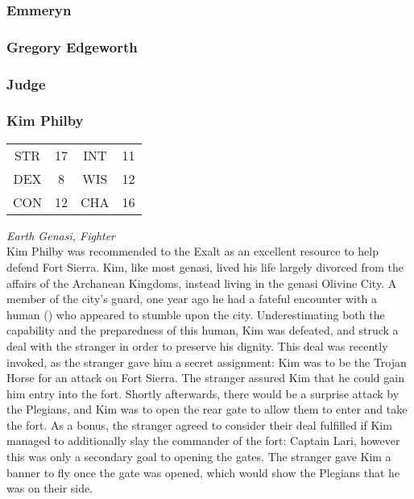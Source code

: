 \subsubsection{Emmeryn}
\label{people:emmeryn}

\subsubsection{Gregory Edgeworth}
\label{people:gregory}

\subsubsection{Judge}
\label{people:judge}

\subsubsection{Kim Philby}
\label{people:philby}
\begin{center}
\begin{tabular}{c c|c c}
STR & 17 & INT & 11\\
DEX & 8 & WIS & 12 \\
CON & 12 & CHA & 16 \end{tabular}\end{center}
\textit{Earth Genasi, Fighter}\\
Kim Philby was recommended to the Exalt as an excellent resource to help defend Fort Sierra. Kim, like most genasi, lived his life largely divorced from the affairs of the Archanean Kingdoms, instead living in the genasi Olivine City. A member of the city's guard, one year ago he had a fateful encounter with a human () who appeared to stumble upon the city. Underestimating both the capability and the preparedness of this human, Kim was defeated, and struck a deal with the stranger in order to preserve his dignity. This deal was recently invoked, as the stranger gave him a secret assignment: Kim was to be the Trojan Horse for an attack on Fort Sierra. The stranger assured Kim that he could gain him entry into the fort. Shortly afterwards, there would be a surprise attack by the Plegians, and Kim was to open the rear gate to allow them to enter and take the fort. As a bonus, the stranger agreed to consider their deal fulfilled if Kim managed to additionally slay the commander of the fort: Captain Lari, however this was only a secondary goal to opening the gates. The stranger gave Kim a banner to fly once the gate was opened, which would show the Plegians that he was on their side. 

